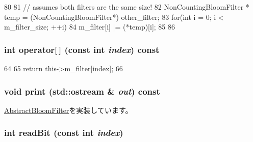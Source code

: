 \begin{DoxyCode}
80 {
81     // assumes both filters are the same size!
82     NonCountingBloomFilter * temp = (NonCountingBloomFilter*) other_filter;
83     for(int i = 0; i < m_filter_size; ++i){
84         m_filter[i] |= (*temp)[i];
85     }
86 }
\end{DoxyCode}
\hypertarget{classNonCountingBloomFilter_ad7ab71ad11e6bca06c3534af5707d8fc}{
\subsubsection[{operator[]}]{\setlength{\rightskip}{0pt plus 5cm}int operator\mbox{[}$\,$\mbox{]} (const int {\em index}) const}}
\label{classNonCountingBloomFilter_ad7ab71ad11e6bca06c3534af5707d8fc}



\begin{DoxyCode}
64     {
65         return this->m_filter[index];
66     }
\end{DoxyCode}
\hypertarget{classNonCountingBloomFilter_ac55fe386a101fbae38c716067c9966a0}{
\subsubsection[{print}]{\setlength{\rightskip}{0pt plus 5cm}void print (std::ostream \& {\em out}) const}}
\label{classNonCountingBloomFilter_ac55fe386a101fbae38c716067c9966a0}


\hyperlink{classAbstractBloomFilter_a3ea5f7af5db62cc24f4e40df9ea5c971}{AbstractBloomFilter}を実装しています。\hypertarget{classNonCountingBloomFilter_a6f8a98d0f38a8d122d4cbf87323484eb}{
\subsubsection[{readBit}]{\setlength{\rightskip}{0pt plus 5cm}int readBit (const int {\em index})}}
\label{classNonCountingBloomFilter_a6f8a98d0f38a8d122d4cbf87323484eb}


